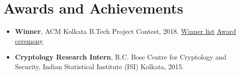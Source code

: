 \documentclass[11pt,a4paper]{article}
\begin{document}
\section{Awards and Achievements}

\begin{itemize}
  \item \textbf{Winner}, ACM Kolkata B.Tech Project Contest, 2018.
        \href{https://kolkata.acm.org/award/2018/contest.html}{Winner list}
        \textbar{} \href{https://www.youtube.com/channel/UCdzovuM-pSreOdDChHaa_Dw}{Award ceremony}
  \item \textbf{Cryptology Research Intern}, R.C. Bose Centre for Cryptology and Security,
        Indian Statistical Institute (ISI) Kolkata, 2015.
\end{itemize}
\end{document}
